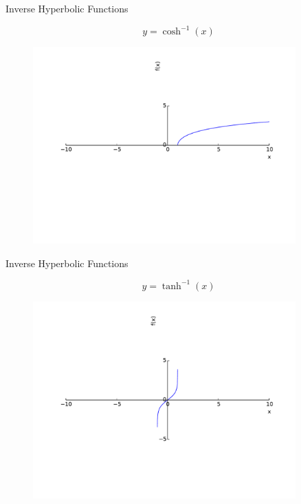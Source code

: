 \documentclass[10pt]{beamer}
\begin{document}
\begin{frame}{Inverse Hyperbolic Functions}

	\begin{equation*}
		y = \cosh^{-1}(x)
	\end{equation*}

	\begin{figure}
		\includegraphics[width=0.9\textwidth]{beamer-pics/hyperbolics-5.pdf}
	\end{figure}

\end{frame}

\begin{frame}{Inverse Hyperbolic Functions}

	\begin{equation*}
		y = \tanh^{-1}(x)
	\end{equation*}

	\begin{figure}
		\includegraphics[width=0.9\textwidth]{beamer-pics/hyperbolics-6.pdf}
	\end{figure}

\end{frame}
\end{document}
